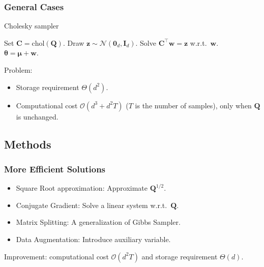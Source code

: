 \documentclass[aspectratio=169]{beamer}
\newcommand{\B}[1]{\mathbf{#1}} %
\newcommand{\Bs}[1]{\boldsymbol{#1}} %
\begin{document}
\begin{frame}
\frametitle{General Cases}
\begin{algorithm}[H]
\caption{Cholesky sampler}
\begin{algorithmic}[1]
\State Set $\B{C} = \mathrm{chol}(\B{Q})$.
\Comment{\textcolor{blue}{$\B{Q} = \B{C}\B{C}^{\top}$}}
\State Draw $\B{z} \sim \mathcal{N}(\B{0}_d,\B{I}_d)$.
\State Solve $\B{C}^{\top}\B{w} = \B{z}$ w.r.t.\ $\B{w}$.\\
\Return $\Bs{\theta} = \Bs{\mu} + \B{w}$.
\end{algorithmic}
\end{algorithm}
Problem: 
\begin{itemize}
\item Storage requirement \(\Theta(d^2)\).
\item Computational cost \(\mathcal{O}(d^3 + d^2T)\) (\(T\) is the number of samples), only when \(\B{Q}\) is unchanged.
\end{itemize}
\end{frame}

\subsection{Methods}
\begin{frame}
\frametitle{More Efficient Solutions}
\begin{itemize}
    \item Square Root approximation: Approximate \(\B{Q}^{1/2}\).
    \item Conjugate Gradient: Solve a linear system w.r.t.\ \(\B{Q}\).
    \item Matrix Splitting: A generalization of Gibbs Sampler.
    \item Data Augmentation: Introduce auxiliary variable.
\end{itemize}
Improvement: computational cost $\mathcal{O}(d^2T)$ and storage requirement $\Theta(d)$.
\end{frame}
\end{document}
